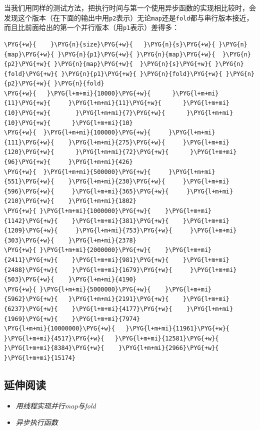 
当我们用同样的测试方法，把执行时间与第一个使用异步函数的实现相比较时，会发现这个版本（在下面的输出中用\texttt{p2}表示）无论\texttt{map}还是\texttt{fold}都与串行版本接近，而且比前面给出的第一个并行版本（用\texttt{p1}表示）差得多：



\begin{codeblockbg}
\begin{Verbatim}[commandchars=\\\{\},breaklines=true,breakanywhere=true,fontsize=\codefont,xleftmargin=17bp]
\PYG{+w}{    }\PYG{n}{size}\PYG{+w}{   }\PYG{n}{s}\PYG{+w}{ }\PYG{n}{map}\PYG{+w}{ }\PYG{n}{p1}\PYG{+w}{ }\PYG{n}{map}\PYG{+w}{  }\PYG{n}{p2}\PYG{+w}{ }\PYG{n}{map}\PYG{+w}{  }\PYG{n}{s}\PYG{+w}{ }\PYG{n}{fold}\PYG{+w}{ }\PYG{n}{p1}\PYG{+w}{ }\PYG{n}{fold}\PYG{+w}{ }\PYG{n}{p2}\PYG{+w}{ }\PYG{n}{fold}
\PYG{+w}{   }\PYG{l+m+mi}{10000}\PYG{+w}{      }\PYG{l+m+mi}{11}\PYG{+w}{     }\PYG{l+m+mi}{11}\PYG{+w}{      }\PYG{l+m+mi}{10}\PYG{+w}{       }\PYG{l+m+mi}{7}\PYG{+w}{      }\PYG{l+m+mi}{10}\PYG{+w}{      }\PYG{l+m+mi}{10}
\PYG{+w}{  }\PYG{l+m+mi}{100000}\PYG{+w}{     }\PYG{l+m+mi}{111}\PYG{+w}{    }\PYG{l+m+mi}{275}\PYG{+w}{     }\PYG{l+m+mi}{120}\PYG{+w}{      }\PYG{l+m+mi}{72}\PYG{+w}{      }\PYG{l+m+mi}{96}\PYG{+w}{     }\PYG{l+m+mi}{426}
\PYG{+w}{  }\PYG{l+m+mi}{500000}\PYG{+w}{     }\PYG{l+m+mi}{551}\PYG{+w}{    }\PYG{l+m+mi}{230}\PYG{+w}{     }\PYG{l+m+mi}{596}\PYG{+w}{     }\PYG{l+m+mi}{365}\PYG{+w}{     }\PYG{l+m+mi}{210}\PYG{+w}{    }\PYG{l+m+mi}{1802}
\PYG{+w}{ }\PYG{l+m+mi}{1000000}\PYG{+w}{    }\PYG{l+m+mi}{1142}\PYG{+w}{    }\PYG{l+m+mi}{381}\PYG{+w}{    }\PYG{l+m+mi}{1209}\PYG{+w}{     }\PYG{l+m+mi}{753}\PYG{+w}{     }\PYG{l+m+mi}{303}\PYG{+w}{    }\PYG{l+m+mi}{2378}
\PYG{+w}{ }\PYG{l+m+mi}{2000000}\PYG{+w}{    }\PYG{l+m+mi}{2411}\PYG{+w}{    }\PYG{l+m+mi}{981}\PYG{+w}{    }\PYG{l+m+mi}{2488}\PYG{+w}{    }\PYG{l+m+mi}{1679}\PYG{+w}{     }\PYG{l+m+mi}{503}\PYG{+w}{    }\PYG{l+m+mi}{4190}
\PYG{+w}{ }\PYG{l+m+mi}{5000000}\PYG{+w}{    }\PYG{l+m+mi}{5962}\PYG{+w}{   }\PYG{l+m+mi}{2191}\PYG{+w}{    }\PYG{l+m+mi}{6237}\PYG{+w}{    }\PYG{l+m+mi}{4177}\PYG{+w}{    }\PYG{l+m+mi}{1969}\PYG{+w}{    }\PYG{l+m+mi}{7974}
\PYG{l+m+mi}{10000000}\PYG{+w}{   }\PYG{l+m+mi}{11961}\PYG{+w}{   }\PYG{l+m+mi}{4517}\PYG{+w}{   }\PYG{l+m+mi}{12581}\PYG{+w}{    }\PYG{l+m+mi}{8384}\PYG{+w}{    }\PYG{l+m+mi}{2966}\PYG{+w}{   }\PYG{l+m+mi}{15174}
\end{Verbatim}
\end{codeblockbg}



\subsection{延伸阅读}



\begin{itemize}
\item \textit{用线程实现并行map与fold}



\item \textit{异步执行函数}

\end{itemize}
